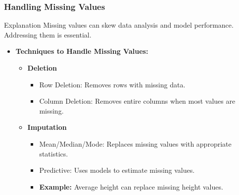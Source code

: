 \documentclass[aspectratio=169]{beamer}
\begin{document}
\begin{frame}[fragile]
    \frametitle{Handling Missing Values}
    \begin{block}{Explanation}
        Missing values can skew data analysis and model performance. Addressing them is essential.
    \end{block}
    \begin{itemize}
        \item \textbf{Techniques to Handle Missing Values:}
        \begin{itemize}
            \item \textbf{Deletion}
            \begin{itemize}
                \item Row Deletion: Removes rows with missing data.
                \item Column Deletion: Removes entire columns when most values are missing.
            \end{itemize}
            \item \textbf{Imputation}
            \begin{itemize}
                \item Mean/Median/Mode: Replaces missing values with appropriate statistics.
                \item Predictive: Uses models to estimate missing values.
                \item \textbf{Example:} Average height can replace missing height values.
            \end{itemize}
        \end{itemize}
    \end{itemize}
\end{frame}
\end{document}
